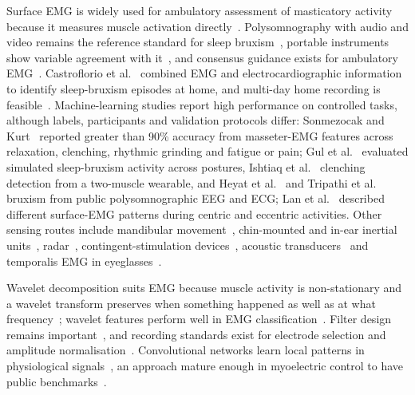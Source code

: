 \documentclass[journal]{IEEEtran}
\begin{document}
Surface EMG is widely used for ambulatory assessment of masticatory activity because it measures muscle activation directly~\cite{raez2006techniques,farella2008masticatory}. Polysomnography with audio and video remains the reference standard for sleep bruxism~\cite{lavigne1996sleep,stuginski2016detection}, portable instruments show variable agreement with it~\cite{casett2017validity,cidverdejo2024instrumental}, and consensus guidance exists for ambulatory EMG~\cite{lobbezoo2020consensus}. Castroflorio et al.~\cite{castroflorio2013use,castroflorio2014detection} combined EMG and electrocardiographic information to identify sleep-bruxism episodes at home, and multi-day home recording is feasible~\cite{colonna2023electromyographic}. Machine-learning studies report high performance on controlled tasks, although labels, participants and validation protocols differ: Sonmezocak and Kurt~\cite{sonmezocak2021detection,sonmezocak2021machine} reported greater than 90\% accuracy from masseter-EMG features across relaxation, clenching, rhythmic grinding and fatigue or pain; Gul et al.~\cite{gul2024advanced} evaluated simulated sleep-bruxism activity across postures, Ishtiaq et al.~\cite{ishtiaq2025wearable} clenching detection from a two-muscle wearable, and Heyat et al.~\cite{heyat2020computational} and Tripathi et al.~\cite{tripathi2024computational} bruxism from public polysomnographic EEG and ECG; Lan et al.~\cite{lan2022comparative} described different surface-EMG patterns during centric and eccentric activities. Other sensing routes include mandibular movement~\cite{martinot2021artificial}, chin-mounted and in-ear inertial units~\cite{patwa2017bruxism,schlaepfer2026new,bondareva2021earables}, radar~\cite{shen2026bruxism}, contingent-stimulation devices~\cite{haugland2020automatic}, acoustic transducers~\cite{nahhas2024wearable} and temporalis EMG in eyeglasses~\cite{zhang2018monitoring}.

Wavelet decomposition suits EMG because muscle activity is non-stationary and a wavelet transform preserves when something happened as well as at what frequency~\cite{mallat1989theory,daubechies1992ten,englehart2003robust}; wavelet features perform well in EMG classification~\cite{phinyomark2012feature,bharathi2025unveiling}. Filter design remains important~\cite{chowdhury2013surface,deluca2010filtering,clancy2002sampling,merletti2020tutorial,boyer2023reducing}, and recording standards exist for electrode selection and amplitude normalisation~\cite{isek1999standards,hermens2000development,besomi2019consensus,besomi2020consensus,merletti2019tutorial}. Convolutional networks learn local patterns in physiological signals~\cite{faust2018deep,kiranyaz20211d}, an approach mature enough in myoelectric control to have public benchmarks~\cite{atzori2014electromyography,coteallard2019deep}.
\end{document}
